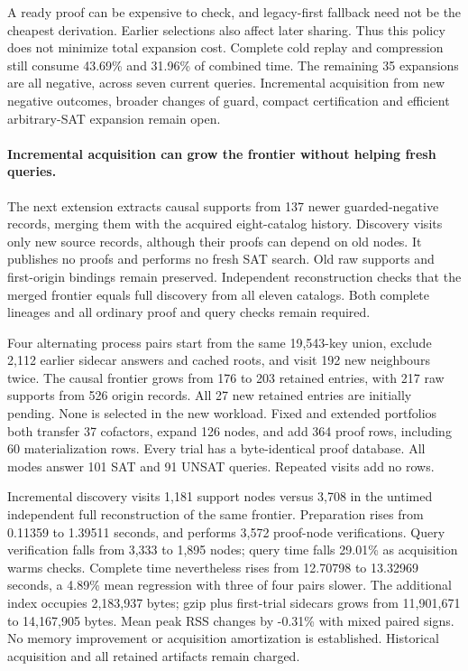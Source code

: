 \documentclass[11pt,a4paper]{article}
\numberwithin{equation}{section}
\theoremstyle{plain}
\theoremstyle{definition}
\theoremstyle{remark}
\begin{document}
A ready proof can be expensive to check, and legacy-first fallback need not be
the cheapest derivation. Earlier selections also affect later sharing. Thus this
policy does not minimize total expansion cost. Complete cold replay and
compression still consume 43.69\% and 31.96\% of combined time. The remaining
35 expansions are all negative, across seven current queries. Incremental
acquisition from new negative outcomes, broader changes of guard, compact
certification and efficient arbitrary-SAT expansion remain open.

\paragraph{Incremental acquisition can grow the frontier without helping fresh queries.}
The next extension extracts causal supports from 137 newer guarded-negative
records, merging them with the acquired eight-catalog history. Discovery visits
only new source records, although their proofs can depend on old nodes. It
publishes no proofs and performs no fresh SAT search. Old raw supports and
first-origin bindings remain preserved. Independent reconstruction checks that
the merged frontier equals full discovery from all eleven catalogs. Both complete
lineages and all ordinary proof and query checks remain required.

Four alternating process pairs start from the same 19,543-key union, exclude
2,112 earlier sidecar answers and cached roots, and visit 192 new neighbours
twice. The causal frontier grows from 176 to 203 retained entries, with 217 raw
supports from 526 origin records. All 27 new retained entries are initially
pending. None is selected in the new workload. Fixed and extended portfolios
both transfer 37 cofactors, expand 126 nodes, and add 364 proof rows, including
60 materialization rows. Every trial has a byte-identical proof database. All
modes answer 101 SAT and 91 UNSAT queries. Repeated visits add no rows.

Incremental discovery visits 1,181 support nodes versus 3,708 in the untimed
independent full reconstruction of the same frontier. Preparation rises from
0.11359 to 1.39511 seconds, and performs 3,572 proof-node verifications. Query
verification falls from 3,333 to 1,895 nodes; query time falls 29.01\% as
acquisition warms checks. Complete time nevertheless rises from 12.70798 to
13.32969 seconds, a 4.89\% mean regression with three of four pairs slower.
The additional index occupies 2,183,937 bytes; gzip plus first-trial sidecars
grows from 11,901,671 to 14,167,905 bytes. Mean peak RSS changes by -0.31\%
with mixed paired signs. No memory improvement or acquisition amortization is
established. Historical acquisition and all retained artifacts remain charged.
\end{document}
